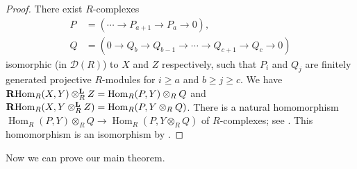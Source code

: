 \documentclass[a4, 10pt]{amsart}
\theoremstyle{plain}
\theoremstyle{definition}
\theoremstyle{remark}
\def\Hom{\operatorname{Hom}}
\def\RHom{\operatorname{{\bf R}Hom}}
\def\D{{\mathcal D}}
\begin{document}
\begin{proof}
There exist $R$-complexes
\begin{align*}
P & =(\cdots\to P_{a+1}\to P_a\to 0),\\
Q & =(0\to Q_b\to Q_{b-1}\to\cdots\to Q_{c+1}\to Q_c\to 0)
\end{align*}
isomorphic (in $\D(R)$) to $X$ and $Z$ respectively, such that $P_i$ and $Q_j$ are finitely generated projective $R$-modules for $i\ge a$ and $b\ge j\ge c$.
We have $\RHom_R(X,Y)\otimes_R^{\bf L}Z=\Hom_R(P,Y)\otimes_RQ$ and $\RHom_R(X,Y\otimes_R^{\bf L}Z)=\Hom_R(P,Y\otimes_RQ)$.
There is a natural homomorphism $\Hom_R(P,Y)\otimes_RQ\to\Hom_R(P,Y\otimes_RQ)$ of $R$-complexes; see \cite[(A.2.10)]{Cb}.
This homomorphism is an isomorphism by \cite[(2.7)]{CV}.
\end{proof}

Now we can prove our main theorem.
\end{document}
